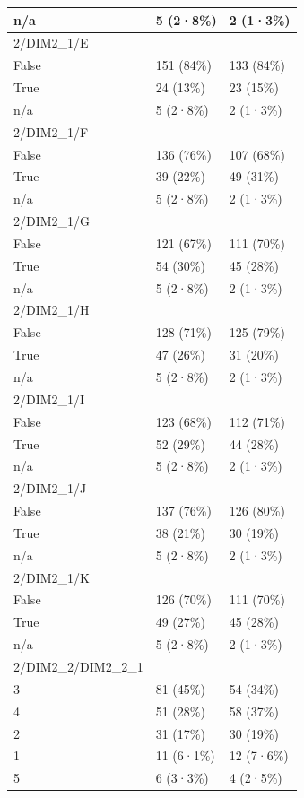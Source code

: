 \documentclass[
]{book}
\begin{document}
\begin{tabular}{l|l|l}
\hline
n/a & 5 (2·8\%) & 2 (1·3\%)\\
\hline
2/DIM2\_1/E &  & \\
\hline
False & 151 (84\%) & 133 (84\%)\\
\hline
True & 24 (13\%) & 23 (15\%)\\
\hline
n/a & 5 (2·8\%) & 2 (1·3\%)\\
\hline
2/DIM2\_1/F &  & \\
\hline
False & 136 (76\%) & 107 (68\%)\\
\hline
True & 39 (22\%) & 49 (31\%)\\
\hline
n/a & 5 (2·8\%) & 2 (1·3\%)\\
\hline
2/DIM2\_1/G &  & \\
\hline
False & 121 (67\%) & 111 (70\%)\\
\hline
True & 54 (30\%) & 45 (28\%)\\
\hline
n/a & 5 (2·8\%) & 2 (1·3\%)\\
\hline
2/DIM2\_1/H &  & \\
\hline
False & 128 (71\%) & 125 (79\%)\\
\hline
True & 47 (26\%) & 31 (20\%)\\
\hline
n/a & 5 (2·8\%) & 2 (1·3\%)\\
\hline
2/DIM2\_1/I &  & \\
\hline
False & 123 (68\%) & 112 (71\%)\\
\hline
True & 52 (29\%) & 44 (28\%)\\
\hline
n/a & 5 (2·8\%) & 2 (1·3\%)\\
\hline
2/DIM2\_1/J &  & \\
\hline
False & 137 (76\%) & 126 (80\%)\\
\hline
True & 38 (21\%) & 30 (19\%)\\
\hline
n/a & 5 (2·8\%) & 2 (1·3\%)\\
\hline
2/DIM2\_1/K &  & \\
\hline
False & 126 (70\%) & 111 (70\%)\\
\hline
True & 49 (27\%) & 45 (28\%)\\
\hline
n/a & 5 (2·8\%) & 2 (1·3\%)\\
\hline
2/DIM2\_2/DIM2\_2\_1 &  & \\
\hline
3 & 81 (45\%) & 54 (34\%)\\
\hline
4 & 51 (28\%) & 58 (37\%)\\
\hline
2 & 31 (17\%) & 30 (19\%)\\
\hline
1 & 11 (6·1\%) & 12 (7·6\%)\\
\hline
5 & 6 (3·3\%) & 4 (2·5\%)\\

\end{tabular}
\end{document}
